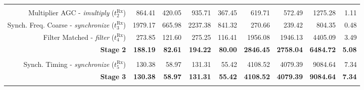 \begin{table}[htp]
{{\begin{tabular}{r | r r r r  | r r r | r}
                                                                              &                  &                   &                   &                                         &                   &                   &                   &                \\
                   Multiplier AGC -     \emph{imultiply} ($t^\text{Rx}_{2}$)  &          864.41  &           420.05  &           935.71  &                                 367.45  &           619.71  &           572.49  &          1275.28  &          1.11  \\
    \rowcolor{Paired-7!15}
              Synch. Freq. Coarse -   \emph{synchronize} ($t^\text{Rx}_{3}$)  &         1979.17  &           665.98  &          2237.38  &                                 841.32  &           270.66  &           239.42  &           804.35  &          0.48  \\
    \rowcolor{Paired-7!15}
                   Filter Matched -        \emph{filter} ($t^\text{Rx}_{4}$)  &          273.85  &           121.60  &           275.25  &                                 116.41  &          1956.08  &          1946.13  &          4405.09  &          3.49  \\ \hline
                                                             \textbf{Stage 2} &  \textbf{188.19} &    \textbf{82.61} &   \textbf{194.22} &                          \textbf{80.00} &  \textbf{2846.45} &  \textbf{2758.04} &  \textbf{6484.72} & \textbf{5.08}  \\ %
                                                                              &                  &                   &                   &                                         &                   &                   &                   &                \\
    \rowcolor{Paired-7!15}
                   Synch. Timing  -   \emph{synchronize} ($t^\text{Rx}_{5}$)  &          130.38  &            58.97  &           131.31  &                                  55.42  &          4108.52  &          4079.39  &          9084.64  &          7.34  \\ \hline
    \rowcolor{Paired-5!15}                                   \textbf{Stage 3} &  \textbf{130.38} &    \textbf{58.97} &   \textbf{131.31} &                          \textbf{55.42} &  \textbf{4108.52} &  \textbf{4079.39} &  \textbf{9084.64} &  \textbf{7.34} \\ %
                                                                              &                  &                   &                   &                                         &                   &                   &                   &                \\

\end{tabular}}}
\end{table}
